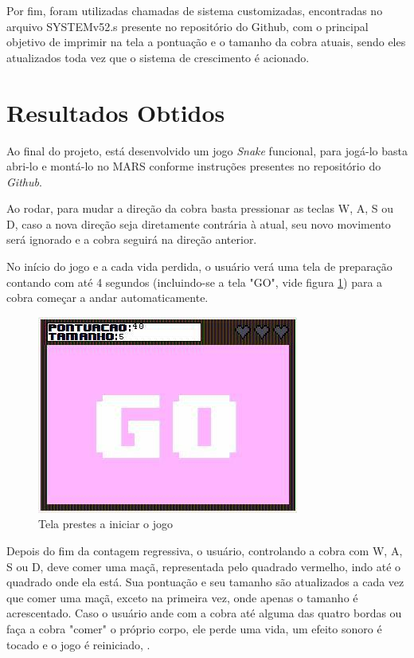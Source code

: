 \documentclass[a4paper]{sbgames}
\begin{document}
{{Por fim, foram utilizadas chamadas de sistema customizadas, encontradas no arquivo SYSTEMv52.s presente no repositório do Github, com o principal objetivo de imprimir na tela a pontuação e o tamanho da cobra atuais, sendo eles atualizados toda vez que o sistema de crescimento é acionado.

\section{Resultados Obtidos}
\label{sec:Resultados}
Ao final do projeto, está desenvolvido um jogo \textit{Snake} funcional, para jogá-lo basta abri-lo e montá-lo no MARS conforme instruções presentes no repositório do \textit{Github}.

Ao rodar, para mudar a direção da cobra basta pressionar as teclas W, A, S ou D, caso a nova direção seja diretamente contrária à atual, seu novo movimento será ignorado e a cobra seguirá na direção anterior.

No início do jogo e a cada vida perdida, o usuário verá uma tela de preparação contando com até 4 segundos (incluindo-se a tela "GO", vide figura \ref{fig:04}) para a cobra começar a andar automaticamente.

\begin{figure}[htb]
  \begin{center}
   \includegraphics[width=1.0\linewidth]{./Figures/go.jpg}
  \caption{Tela prestes a iniciar o jogo}
  \end{center}
  \label{fig:04}
\end{figure}

Depois do fim da contagem regressiva, o usuário, controlando a cobra com W, A, S ou D, deve comer uma maçã, representada pelo quadrado vermelho, indo até o quadrado onde ela está. Sua pontuação e seu tamanho são atualizados a cada vez que comer uma maçã, exceto na primeira vez, onde apenas o tamanho é acrescentado. Caso o usuário ande com a cobra até alguma das quatro bordas ou faça a cobra "comer" o próprio corpo, ele perde uma vida, um efeito sonoro é tocado e o jogo é reiniciado, .

}}
\end{document}
